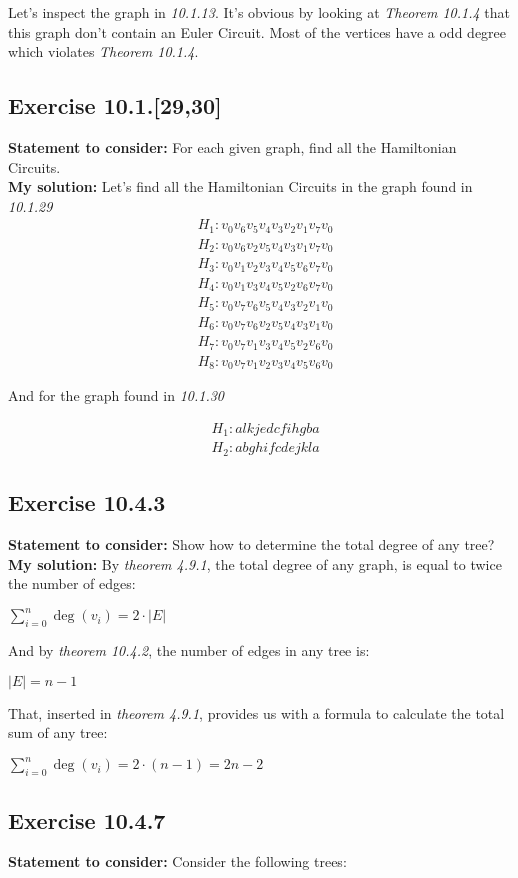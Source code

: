 \documentclass{report}
\newcommand{\cent}[1]{\begin{center}#1\end{center}}
\newcommand{\mAlign}[1]{\begin{align*}#1\end{align*}}
\newcommand{\assignmentDescription}{\textbf{Statement to consider: }}
\newcommand{\solution}{\textbf{My solution: }}
\newcommand{\Exercise}[1]{\subsection{Exercise #1}}
\begin{document}
	Let's inspect the graph in \textit{10.1.13}. It's obvious by looking at \textit{Theorem 10.1.4} that this graph don't contain an Euler Circuit. Most of the vertices have a odd degree which violates \textit{Theorem 10.1.4}.
	
	\Exercise{10.1.[29,30]}
	
	\assignmentDescription
	For each given graph, find all the Hamiltonian Circuits.\\
	
	\solution
	Let's find all the Hamiltonian Circuits in the graph found in \textit{10.1.29}
	\mAlign{&H_1 : v_0 v_6 v_5 v_4 v_3 v_2 v_1 v_7 v_0 \\
				 &H_2 : v_0 v_6 v_2 v_5 v_4 v_3 v_1 v_7 v_0 \\
			 	&H_3 : v_0 v_1 v_2 v_3 v_4 v_5 v_6 v_7 v_0 \\
		 		&H_4 : v_0 v_1 v_3 v_4 v_5 v_2 v_6 v_7 v_0 \\
	 		  	&H_5 : v_0 v_7 v_6 v_5 v_4 v_3 v_2 v_1 v_0 \\
	 		  	&H_6 : v_0 v_7 v_6 v_2 v_5 v_4 v_3 v_1 v_0 \\
	 		  	&H_7 : v_0 v_7 v_1 v_3 v_4 v_5 v_2 v_6 v_0 \\
	 		  	&H_8 : v_0 v_7 v_1 v_2 v_3 v_4 v_5 v_6 v_0}
  	
  	And for the graph found in \textit{10.1.30}
 	
 	\mAlign{&H_1 : a l k j e d c f i h g b a \\
 				  &H_2 : a b g h i f c d e j k l a}
	
	\Exercise{10.4.3}
	
	\assignmentDescription
	Show how to determine the total degree of any tree?\\
	
	\solution
	By \textit{theorem 4.9.1}, the total degree of any graph, is equal to twice the number of edges:
	
	\cent{$\sum_{i = 0}^{n} \deg(v_i) = 2 \cdot |E|$}
	
	And by \textit{theorem 10.4.2}, the number of edges in any tree is:
	
	\cent{$|E| = n-1$}
	
	That, inserted in \textit{theorem 4.9.1}, provides us with a formula to calculate the total sum of any tree:
	
	\cent{$\sum_{i = 0}^{n} \deg(v_i) = 2 \cdot (n-1) = 2n-2$}
	
	\Exercise{10.4.7}
	\assignmentDescription
	Consider the following trees:
	
\end{document}

